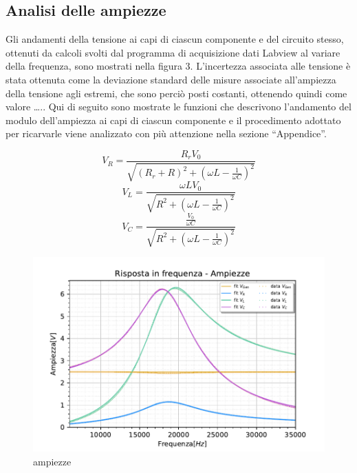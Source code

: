 \subsection{Analisi delle ampiezze}

Gli andamenti della tensione ai capi di ciascun componente e del circuito stesso, ottenuti da calcoli svolti dal programma di acquisizione dati Labview al variare della frequenza, sono mostrati nella figura 3.
L’incertezza associata alle tensione è stata ottenuta come la deviazione standard delle misure associate all’ampiezza della tensione agli estremi, che sono perciò posti costanti, ottenendo quindi come valore …..
Qui di seguito sono mostrate le funzioni che descrivono l’andamento del modulo dell’ampiezza ai capi di ciascun componente e il procedimento adottato per ricarvarle viene analizzato con più attenzione nella sezione “Appendice”.

\[
    V_R = \frac{R_rV_0}{\sqrt{{(R_r+R)}^2+{ \left(\omega L - \frac{1}{\omega C}\right)}^2}}
\]
\[
    V_L = \frac{\omega L V_0}{\sqrt{R^2+{ \left(\omega L - \frac{1}{\omega C}\right)}^2}}
\]
\[
    V_C = \frac{\frac{V_0}{\omega C}}{\sqrt{R^2+{ \left(\omega L - \frac{1}{\omega C}\right)}^2}}
\]

\begin{figure}[h]
    \centering
    \includegraphics[width=1\textwidth]{../figs/Risposta-in-frequenza-ampiezze.pdf}
    \caption{ampiezze}\label{fig:ampiezzeRLC}
\end{figure}


